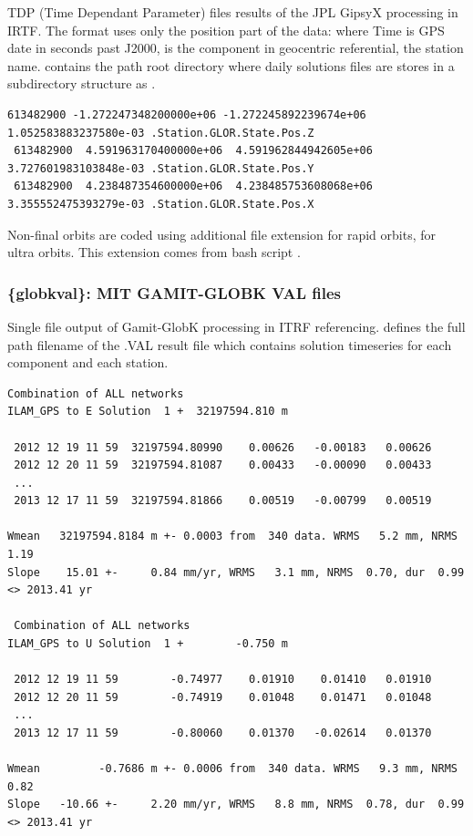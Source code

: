 TDP (Time Dependant Parameter) files results of the JPL GipsyX processing in IRTF. The format uses only the position part of the data:  where Time is GPS date in seconds past J2000,  is the component in geocentric referential,  the station name.  contains the path root directory where daily solutions files are stores in a subdirectory structure as .

\begin{lstlisting}[language={},title=GipsyX TDP format example]
 613482900 -1.272247348200000e+06 -1.272245892239674e+06  1.052583883237580e-03 .Station.GLOR.State.Pos.Z
 613482900  4.591963170400000e+06  4.591962844942605e+06  3.727601983103848e-03 .Station.GLOR.State.Pos.Y
 613482900  4.238487354600000e+06  4.238485753608068e+06  3.355552475393279e-03 .Station.GLOR.State.Pos.X
\end{lstlisting}

Non-final orbits are coded using additional file extension  for rapid orbits,  for ultra orbits. This extension comes from bash script .

\subsubsection{\{globkval\}: MIT GAMIT-GLOBK VAL files}

Single file output of Gamit-GlobK processing in ITRF referencing.  defines the full path filename of the .VAL result file which contains solution timeseries for each component and each station.

\begin{lstlisting}[language={},title=GAMIT-GLOBK VAL format example]
 Combination of ALL networks
ILAM_GPS to E Solution  1 +  32197594.810 m

 2012 12 19 11 59  32197594.80990    0.00626   -0.00183   0.00626
 2012 12 20 11 59  32197594.81087    0.00433   -0.00090   0.00433
 ...
 2013 12 17 11 59  32197594.81866    0.00519   -0.00799   0.00519

Wmean   32197594.8184 m +- 0.0003 from  340 data. WRMS   5.2 mm, NRMS  1.19
Slope    15.01 +-     0.84 mm/yr, WRMS   3.1 mm, NRMS  0.70, dur  0.99 <> 2013.41 yr

 Combination of ALL networks
ILAM_GPS to U Solution  1 +        -0.750 m

 2012 12 19 11 59        -0.74977    0.01910    0.01410   0.01910
 2012 12 20 11 59        -0.74919    0.01048    0.01471   0.01048
 ...
 2013 12 17 11 59        -0.80060    0.01370   -0.02614   0.01370

Wmean         -0.7686 m +- 0.0006 from  340 data. WRMS   9.3 mm, NRMS  0.82
Slope   -10.66 +-     2.20 mm/yr, WRMS   8.8 mm, NRMS  0.78, dur  0.99 <> 2013.41 yr
\end{lstlisting}


